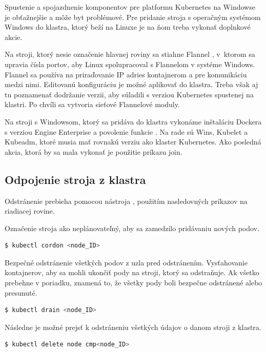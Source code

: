 Spustenie a spojazdnenie komponentov pre platformu Kubernetes na Windowse je obťažnejšie a môže byt problémové. Pre pridanie stroja s operačným systémom Windows do klastra, ktorý beží na Linuxe je na ňom treba vykonať doplnkové akcie.

Na stroji, ktorý nesie označenie hlavnej roviny sa stiahne Flannel , v~ktorom sa upravia čísla portov, aby Linux spolupracoval s Flannelom v systéme Windows. Flannel sa používa na priraďovanie IP adries kontajnerom a pre komunikáciu medzi nimi. Editovanú konfiguráciu je možné aplikovať do klastra. Treba však aj tu poznamenať dodržanie verzii, aby súladili s verziou Kubernetes spustenej na klastri. Po chvíli sa vytvoria sieťové Flannelové moduly.

Na stroji s Windowsom, ktorý sa pridáva do klastra vykonáme inštaláciu Dockera s verziou Engine Enterprise a povolenie funkcie . Na rade sú Wins, Kubelet a Kubeadm, ktoré musia mať rovnakú verziu ako klaster Kubernetes. Ako posledná akcia, ktorá by sa mala vykonať je použitie príkazu join.

\subsection{Odpojenie stroja z klastra}

Odstránenie prebieha pomocou nástroja , použitím nasledovných príkazov na riadiacej rovine.

Označenie stroja ako neplánovateľný, aby sa zamedzilo pridávaniu nových podov.

\begin{lstlisting}[language=Bash]
    $ kubectl cordon <node_ID>
    \end{lstlisting}

Bezpečné odstránenie všetkých podov z uzla pred odstránením. Vysťahovanie kontajnerov, aby sa mohli ukončiť pody na stroji, ktorý sa odstraňuje. Ak všetko prebehne v poriadku, znamená to, že všetky pody boli bezpečne odstránené alebo presunuté.

\begin{lstlisting}[language=Bash]
    $ kubectl drain <node_ID>
    \end{lstlisting}

Následne je možné prejsť k odstráneniu všetkých údajov o danom stroji z klastra.

\begin{lstlisting}[language=Bash]
    $ kubectl delete node cmp<node_ID>
    \end{lstlisting}

